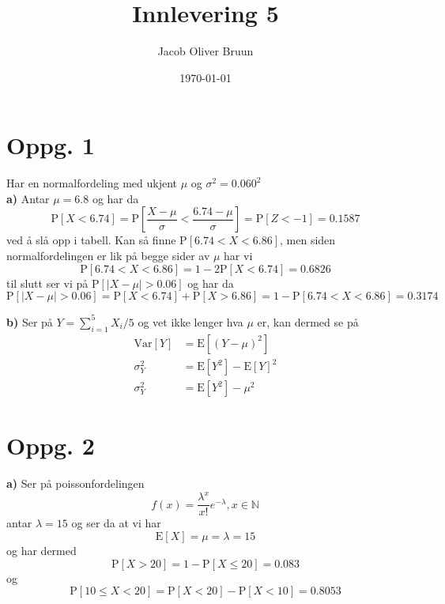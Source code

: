 \documentclass{report}
\title{Innlevering 5}
\author{Jacob Oliver Bruun}
\date{\today}
\newcommand{\M}[2]{\mathbb{#1}^{#2}}
\newcommand{\nbrack}[1]{\left( #1 \right)}
\newcommand{\bbrack}[1]{\left[ #1 \right]}
\newcommand{\Var}[1]{\text{Var} \bbrack{ #1 }}
\newcommand{\std}[1]{\text{E} \bbrack{ #1 }}
\newcommand{\Prob}[1]{\text{P} \bbrack{ #1 }}
\begin{document}
\section*{Oppg. 1}
Har en normalfordeling med ukjent $\mu$ og $\sigma^{2} = 0.060^{2}$ \\

\textbf{a)}
Antar $\mu = 6.8$ og har da
\begin{equation}
  \label{eq:1}
  \Prob{ X < 6.74 } = \Prob{ \frac{X-\mu}{\sigma} < \frac{6.74 - \mu}{\sigma}} = \Prob{ Z < -1 } = 0.1587
\end{equation}
ved å slå opp i tabell. Kan så finne $\Prob{6.74 < X < 6.86}$, men siden normalfordelingen er lik på begge sider av $\mu$ har vi
\begin{equation}
  \label{eq:2}
  \Prob{6.74 < X < 6.86} = 1 - 2\Prob{ X < 6.74 } = 0.6826
\end{equation}
til slutt ser vi på $\Prob{ |X - \mu| > 0.06 }$ og har da
\begin{equation}
  \label{eq:3}
  \Prob{ |X - \mu| > 0.06 } = \Prob{X < 6.74} + \Prob{X > 6.86} = 1 - \Prob{6.74 < X < 6.86} = 0.3174
\end{equation}

\textbf{b)}
Ser på $Y = \sum_{i=1}^{5} X_{i}/5$ og vet ikke lenger hva $\mu$ er, kan dermed se på
\begin{equation}
  \label{eq:5}
  \begin{split}
    \Var{Y} &= \std{\nbrack{Y-\mu}^{2}} \\
    \sigma^{2}_{Y} &= \std{Y^{2}} - \std{Y}^{2} \\
    \sigma^{2}_{Y} &= \std{Y^{2}} - \mu^{2}
  \end{split}
\end{equation}



\section*{Oppg. 2}
\textbf{a)}
Ser på poissonfordelingen
\begin{equation}
  \label{eq:6}
  f(x) = \frac{\lambda^{x}}{x!} e^{-\lambda}, x\in \M{N}{}
\end{equation}
antar $\lambda = 15$ og ser da at vi har
\begin{equation}
  \label{eq:7}
  \std{X} = \mu = \lambda = 15
\end{equation}
og har dermed
\begin{equation}
  \label{eq:8}
  \Prob{X>20} = 1 - \Prob{X\leq 20} = 0.083
\end{equation}
og
\begin{equation}
  \label{eq:9}
  \Prob{10\leq X < 20} = \Prob{X<20} - \Prob{X < 10} = 0.8053
\end{equation}
\end{document}
